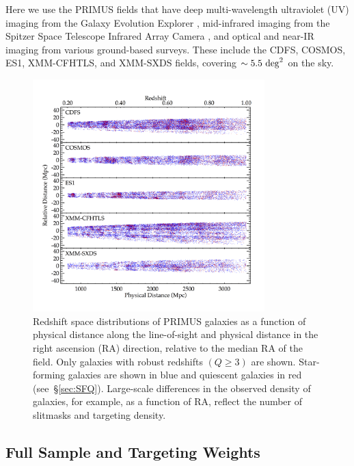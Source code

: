 Here we use the PRIMUS fields that have deep multi-wavelength ultraviolet (UV) imaging from the Galaxy Evolution Explorer 
\citep[GALEX;][]{Martin05}, 
mid-infrared imaging from the Spitzer Space Telescope \citep{Werner04} Infrared Array Camera \citep[IRAC;][]{Fazio04}, and optical and 
near-IR imaging 
from various ground-based surveys.
These include the CDFS, COSMOS, ES1, XMM-CFHTLS, and XMM-SXDS fields, covering $\sim5.5~\degsq$ on the sky.

\begin{figure}
  \centering
  \includegraphics[width=0.8\textwidth,natwidth=600,trim={0.2in 0.5in 0.4in 0.6in},clip]{figures/cone_diagrams.png}
  \caption{Redshift space distributions of PRIMUS galaxies as a function of physical distance along the line-of-sight and physical distance in the right ascension (RA) direction, relative to 
the median RA of the field.
Only galaxies with robust redshifts ${(Q \ge 3)}$ are shown.
Star-forming galaxies are shown in blue and quiescent galaxies in red (see~\S\ref{sec:SFQ}). Large-scale differences in the observed 
density of galaxies, 
for example, as a function of RA, reflect the number of slitmasks and targeting density.
}
  \label{fig:cone_diagrams}
\end{figure}

\subsection{Full Sample and Targeting Weights}\label{sec:targ_weight}
 

